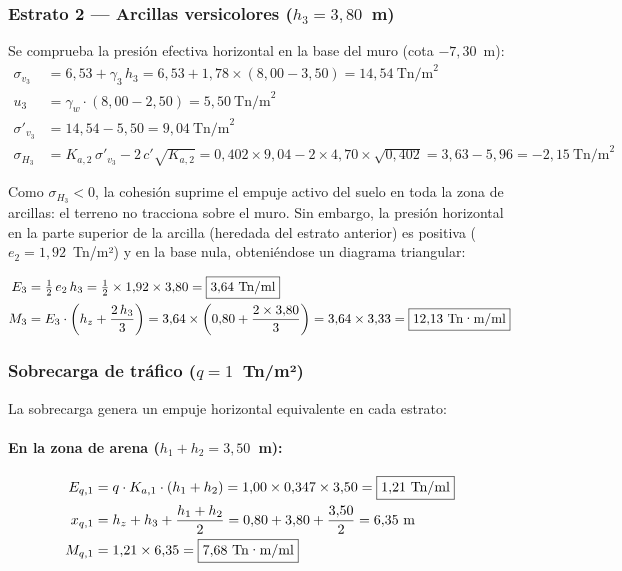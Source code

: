 \subsubsection{Estrato 2 — Arcillas versicolores ($h_3 = 3{,}80$~m)}

Se comprueba la presión efectiva horizontal en la base del muro (cota $-7{,}30$~m):
\begin{align*}
  \sigma_{v_3} &= 6{,}53 + \gamma_3\,h_3 = 6{,}53 + 1{,}78 \times (8{,}00-3{,}50)
                = 14{,}54~\text{Tn/m}^2 \\
  u_3 &= \gamma_w \cdot (8{,}00 - 2{,}50) = 5{,}50~\text{Tn/m}^2 \\
  \sigma'_{v_3} &= 14{,}54 - 5{,}50 = 9{,}04~\text{Tn/m}^2 \\[6pt]
  \sigma_{H_3} &= K_{a,2}\,\sigma'_{v_3} - 2\,c'\sqrt{K_{a,2}}
    = 0{,}402 \times 9{,}04 - 2 \times 4{,}70 \times \sqrt{0{,}402}
    = 3{,}63 - 5{,}96 = -2{,}15~\text{Tn/m}^2 \quad 
\end{align*}

Como $\sigma_{H_3} < 0$, la cohesión suprime el empuje activo del suelo en toda la
zona de arcillas: el terreno no tracciona sobre el muro. Sin embargo, la presión
horizontal en la parte superior de la arcilla (heredada del estrato anterior) es
positiva ($e_2 = 1{,}92$~Tn/m²) y en la base nula, obteniéndose un diagrama
triangular:

\begin{align*}
  E_3 &= \tfrac{1}{2}\,e_2\,h_3
        = \tfrac{1}{2} \times 1{,}92 \times 3{,}80 = \boxed{3{,}64~\text{Tn/ml}} \\
  M_3 &= E_3 \cdot \left(h_z + \frac{2\,h_3}{3}\right)
        = 3{,}64 \times \left(0{,}80 + \frac{2\times3{,}80}{3}\right)
        = 3{,}64 \times 3{,}33 = \boxed{12{,}13~\text{Tn·m/ml}}
\end{align*}

\subsubsection{Sobrecarga de tráfico ($q = 1$~Tn/m²)}

La sobrecarga genera un empuje horizontal equivalente en cada estrato:

\paragraph{En la zona de arena ($h_1 + h_2 = 3{,}50$~m):}
\begin{align*}
  E_{q,1} &= q \cdot K_{a,1} \cdot (h_1+h_2)
            = 1{,}00 \times 0{,}347 \times 3{,}50 = \boxed{1{,}21~\text{Tn/ml}} \\
  x_{q,1} &= h_z + h_3 + \frac{h_1+h_2}{2}
            = 0{,}80 + 3{,}80 + \frac{3{,}50}{2} = 6{,}35~\text{m} \\
  M_{q,1} &= 1{,}21 \times 6{,}35 = \boxed{7{,}68~\text{Tn·m/ml}}
\end{align*}

